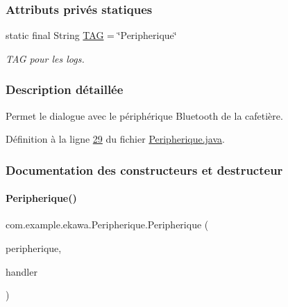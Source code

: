 \subsubsection*{Attributs privés statiques}
\begin{DoxyCompactItemize}
\item 
static final String \hyperlink{classcom_1_1example_1_1ekawa_1_1_peripherique_a80ad0e52c530c7dc114109ff777ae975}{T\+AG} = \char`\"{}Peripherique\char`\"{}
\begin{DoxyCompactList}\small\item\em T\+AG pour les logs. \end{DoxyCompactList}\end{DoxyCompactItemize}


\subsubsection{Description détaillée}
Permet le dialogue avec le périphérique Bluetooth de la cafetière. 

Définition à la ligne \hyperlink{_peripherique_8java_source_l00029}{29} du fichier \hyperlink{_peripherique_8java_source}{Peripherique.\+java}.



\subsubsection{Documentation des constructeurs et destructeur}
\mbox{\label{classcom_1_1example_1_1ekawa_1_1_peripherique_af952f48e767069b44804a96119bf3c75}} 
\paragraph{\texorpdfstring{Peripherique()}{Peripherique()}}
{\footnotesize\ttfamily com.\+example.\+ekawa.\+Peripherique.\+Peripherique (\begin{DoxyParamCaption}\item[{Bluetooth\+Device}]{peripherique,  }\item[{Handler}]{handler }\end{DoxyParamCaption})}



